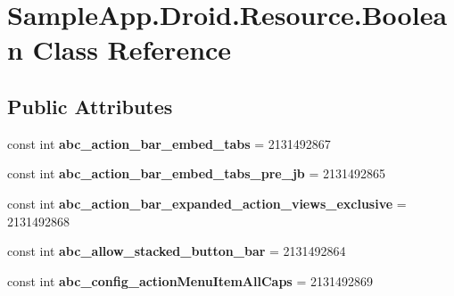 \hypertarget{class_sample_app_1_1_droid_1_1_resource_1_1_boolean}{}\section{Sample\+App.\+Droid.\+Resource.\+Boolean Class Reference}
\label{class_sample_app_1_1_droid_1_1_resource_1_1_boolean}
\subsection*{Public Attributes}
\begin{DoxyCompactItemize}
\item 
\mbox{\label{class_sample_app_1_1_droid_1_1_resource_1_1_boolean_ac6cbd11b61c90da26753e9d31f9a2029}} 
const int {\bfseries abc\+\_\+action\+\_\+bar\+\_\+embed\+\_\+tabs} = 2131492867
\item 
\mbox{\label{class_sample_app_1_1_droid_1_1_resource_1_1_boolean_a68e3796767a2a5ccaa2945335e0bf953}} 
const int {\bfseries abc\+\_\+action\+\_\+bar\+\_\+embed\+\_\+tabs\+\_\+pre\+\_\+jb} = 2131492865
\item 
\mbox{\label{class_sample_app_1_1_droid_1_1_resource_1_1_boolean_a8da813c46d8b8445467fbc35c11290f5}} 
const int {\bfseries abc\+\_\+action\+\_\+bar\+\_\+expanded\+\_\+action\+\_\+views\+\_\+exclusive} = 2131492868
\item 
\mbox{\label{class_sample_app_1_1_droid_1_1_resource_1_1_boolean_a8d14ec4fc6cfc7c70dc619df610229b9}} 
const int {\bfseries abc\+\_\+allow\+\_\+stacked\+\_\+button\+\_\+bar} = 2131492864
\item 
\mbox{\label{class_sample_app_1_1_droid_1_1_resource_1_1_boolean_a9179588b6a5b1bc8d257d3e68232a86a}} 
const int {\bfseries abc\+\_\+config\+\_\+action\+Menu\+Item\+All\+Caps} = 2131492869
\item 
\mbox{\label{class_sample_app_1_1_droid_1_1_resource_1_1_boolean_a15e99abc4ba02527b6b777c323ef0ec2}} 

\end{DoxyCompactItemize}
